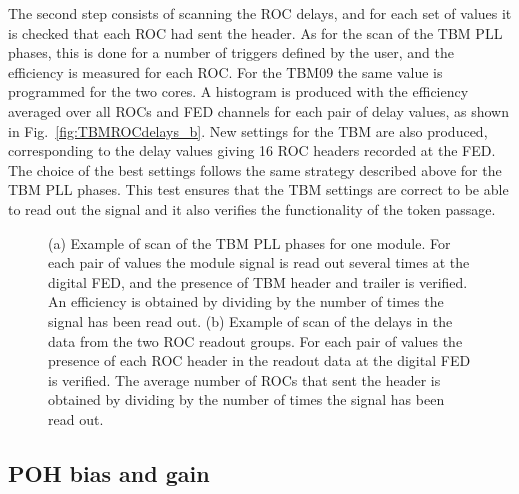 The second step consists of scanning the ROC delays, and for each set of values it is checked that each ROC had sent the header.
As for the scan of the TBM PLL phases, this is done for a number of triggers defined by the user, and the efficiency is measured for each ROC.
For the TBM09 the same value is programmed for the two cores.
A histogram is produced with the efficiency averaged over all ROCs and FED channels for each pair of delay values, as shown in Fig.~\ref{fig:TBMROCdelays_b}.
New settings for the TBM are also produced, corresponding to the delay values giving 16 ROC headers recorded at the FED.
The choice of the best settings follows the same strategy described above for the TBM PLL phases.
This test ensures that the TBM settings are correct to be able to read out the signal and it also verifies the functionality of the token passage.

\begin{figure}[!htb]
 \begin{center}
 \end{center}
 \caption{(a) Example of scan of the TBM PLL phases for one module. For each pair of values the module signal is read out several times at the digital FED, and the presence of TBM header and trailer is verified.
 An efficiency is obtained by dividing by the number of times the signal has been read out.
 (b) Example of scan of the delays in the  data from the two ROC readout groups. For each pair of values the presence of each ROC header in the readout data at the digital FED is verified. The average number of ROCs that sent the header is obtained by dividing by the number of times the signal has been read out.}
 \label{fig:TBMROCdelays}
\end{figure} 

\subsection{POH bias and gain}

